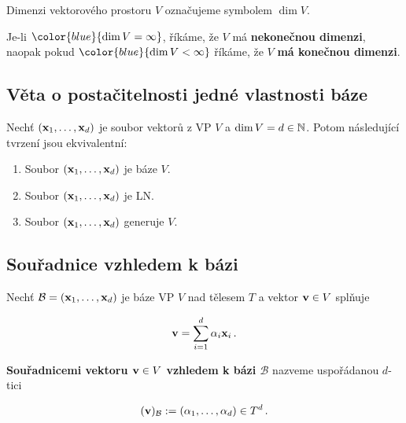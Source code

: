 \noindent Dimenzi vektorového prostoru $V$ označujeme symbolem $\dim V$.

\noindent Je-li $\color{blue}{\dim V = \infty}$, říkáme, že $V$ má \textbf{nekonečnou
      dimenzi}, naopak pokud $\color{blue}{\dim V < \infty}$ říkáme, že $V$
\textbf{má konečnou dimenzi}.

\subsection*{Věta o postačitelnosti jedné vlastnosti báze}

Nechť $(\mathbf{x}_1,\dots,\mathbf{x}_d)$ je soubor vektorů z VP $V$ a $\dim V=d\in\mathbb{N}$. Potom
následující tvrzení jsou ekvivalentní:

\begin{enumerate}
      \item Soubor $(\mathbf{x}_1,\dots,\mathbf{x}_d)$ je báze $V$.
      \item Soubor $(\mathbf{x}_1,\dots,\mathbf{x}_d)$ je LN.
      \item Soubor $(\mathbf{x}_1,\dots,\mathbf{x}_d)$ generuje $V$.
\end{enumerate}

\subsection*{Souřadnice vzhledem k bázi}

Nechť $\mathcal B=(\mathbf{x}_1,\dots,\mathbf{x}_d)$ je báze VP $V$ nad tělesem $T$ a vektor $\mathbf{v}\in V$ splňuje

    \[ \mathbf{v}=\sum_{i=1}^{d}\alpha_{i}\mathbf{x}_{i}\,. \]

  \textbf{Souřadnicemi vektoru $\mathbf{v}\in V$ vzhledem k bázi $\mathcal B$} nazveme uspořádanou $d$-tici

    \[ (\mathbf{v})_\mathcal B:=(\alpha_1,\dots,\alpha_d)\in T^{d}\,. \]

\pagebreak